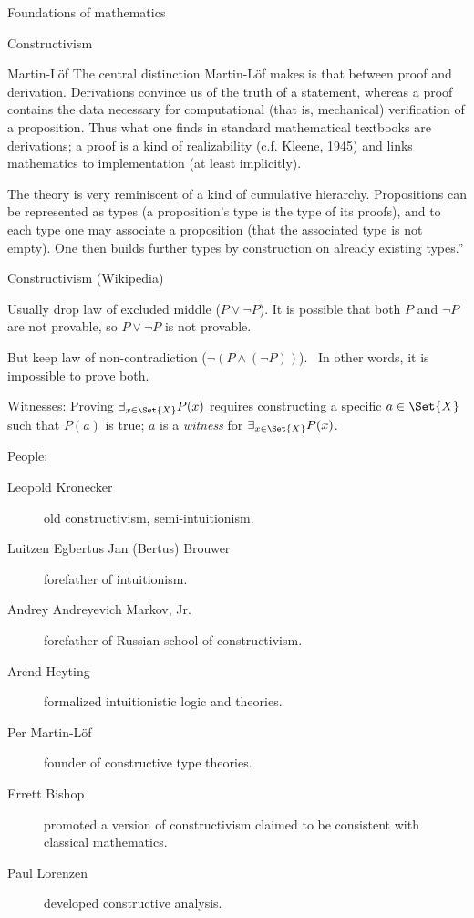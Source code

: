 \begin{plSection}{Foundations of mathematics}
\begin{plSection}{Constructivism}
\begin{plSection}{Martin-L\"{o}f}
The central distinction Martin-Löf makes is that 
between proof and derivation.
Derivations convince us of the truth of a statement, 
whereas a proof contains the data necessary for computational
(that is, mechanical) verification of a proposition. 
Thus what one finds in standard mathematical textbooks are
derivations; 
a proof is a kind of realizability (c.f. Kleene, 1945) and links
mathematics to implementation (at least implicitly).

The theory is very reminiscent of a kind of cumulative hierarchy. 
Propositions can be represented as types 
(a proposition's type is the type of its proofs),
and to each type one may associate a proposition 
(that the associated type is not empty). 
One then builds further types by construction on already existing
types.''

\end{plSection}%
\begin{plSection}{Constructivism (Wikipedia)}
\label{sec:Constructivism_Wikipedia}

\cite{wiki:ConstructivismPhilosophyOfMathematics}

Usually drop law of excluded middle 
($P \vee \lnot P$).\cite{wiki:LawOfExcludedMiddle}
It is possible that both $P$ and $\lnot P$ are not provable,
so $P \vee \lnot P$ is not provable.

But keep law of non-contradiction
($\lnot ( P \wedge (\lnot P))$).~\cite{wiki:LawOfNoncontradiction}
In other words, it is impossible to prove both.

Witnesses: Proving $\exists _{x\in \Set{X}}P(x)$ requires
constructing a specific $a \in \Set{X}$ such that $P(a)$ is true; 
$a$ is a \textit{witness} for $\exists _{x\in \Set{X}}P(x)$.

People\cite{wiki:ConstructivismPhilosophyOfMathematics}:
\begin{description}
\item[Leopold Kronecker] old constructivism, semi-intuitionism.
\item[Luitzen Egbertus Jan (Bertus) Brouwer] forefather of intuitionism.
\item[Andrey Andreyevich Markov, Jr. ] forefather of Russian school of constructivism.
\item[Arend Heyting] formalized intuitionistic logic and theories.
\item[Per Martin-Löf] founder of constructive type theories.
\item[Errett Bishop] promoted a version of constructivism 
claimed to be consistent with classical mathematics.
\item[Paul Lorenzen] developed constructive analysis.
\end{description}


\end{plSection}
\end{plSection}
\end{plSection}
